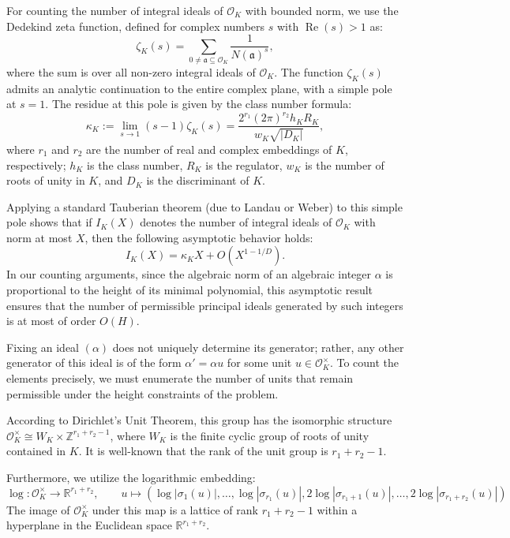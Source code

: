 \documentclass[11pt,a4paper]{article}
\newcommand{\R}{\mathbb{R}}
\newcommand{\Z}{\mathbb{Z}}
\newcommand{\OK}{\mathcal{O}_K}
\begin{document}
For counting the number of integral ideals of $\OK$ with bounded norm, we use the Dedekind zeta function, defined for complex numbers $s$ with $\operatorname{Re}(s) > 1$ as:
\begin{equation*}
    \zeta_K(s) = \sum_{0 \neq \mathfrak{a} \subseteq \OK} \frac{1}{N(\mathfrak{a})^s},
\end{equation*}
where the sum is over all non-zero integral ideals of $\OK$. The function $\zeta_K(s)$ admits an analytic continuation to the entire complex plane, with a simple pole at $s = 1$. The residue at this pole is given by the class number formula:
\begin{equation*}
    \kappa_K := \lim_{s \to 1} (s - 1)\zeta_K(s) = \frac{2^{r_1}(2\pi)^{r_2}h_K R_K}{w_K \sqrt{|D_K|}},
\end{equation*}
where $r_1$ and $r_2$ are the number of real and complex embeddings of $K$, respectively; $h_K$ is the class number, $R_K$ is the regulator, $w_K$ is the number of roots of unity in $K$, and $D_K$ is the discriminant of $K$.

Applying a standard Tauberian theorem (due to Landau or Weber) to this simple pole shows that if $I_K(X)$ denotes the number of integral ideals of $\OK$ with norm at most $X$, then the following asymptotic behavior holds:
\begin{equation*}
    I_K(X) = \kappa_K X + O\left(X^{1 - 1/D}\right).
\end{equation*}
In our counting arguments, since the algebraic norm of an algebraic integer $\alpha$ is proportional to the height of its minimal polynomial, this asymptotic result ensures that the number of permissible principal ideals generated by such integers is at most of order $O(H)$.

Fixing an ideal $(\alpha)$ does not uniquely determine its generator; rather, any other generator of this ideal is of the form $\alpha' = \alpha u$ for some unit $u \in \OK^\times$. To count the elements precisely, we must enumerate the number of units that remain permissible under the height constraints of the problem.

According to Dirichlet's Unit Theorem, this group has the isomorphic structure $\OK^\times \cong W_K \times \Z^{r_1+r_2-1}$, where $W_K$ is the finite cyclic group of roots of unity contained in $K$. It is well-known that the rank of the unit group is $r_1 + r_2 - 1$. 

Furthermore, we utilize the logarithmic embedding:
\begin{equation*}
    \log: \OK^\times \longrightarrow \R^{r_1+r_2}, \qquad u \mapsto \left( \log|\sigma_1(u)|, \dots, \log|\sigma_{r_1}(u)|, 2\log|\sigma_{r_1+1}(u)|, \dots, 2\log|\sigma_{r_1+r_2}(u)| \right)
\end{equation*}
The image of $\OK^\times$ under this map is a lattice of rank $r_1 + r_2 - 1$ within a hyperplane in the Euclidean space $\R^{r_1+r_2}$.
\end{document}
